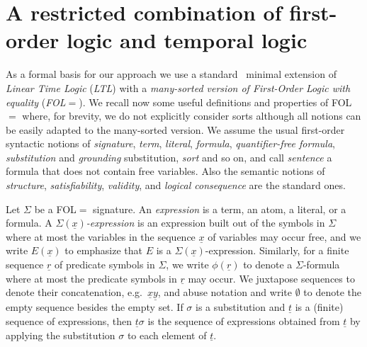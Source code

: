 \documentclass[conference]{IEEEtran}
\begin{document}
\section{A restricted combination of first-order logic and temporal logic}
\label{subsec:comb-fol-ltl}

As a formal basis for our approach we use a
standard~\cite{manna-pnueli-book} minimal extension of \emph{Linear Time Logic} (\emph{LTL})
with a \emph{many-sorted version of First-Order Logic with equality}
(\emph{FOL$=$}). We recall now some useful definitions and properties of
FOL$=$ where, for brevity, we do not explicitly consider sorts
although all notions can be easily adapted to the many-sorted version.
We assume the usual first-order syntactic notions of \emph{signature},
\emph{term}, \emph{literal}, \emph{formula}, \emph{quantifier-free
  formula}, \emph{substitution} and \emph{grounding} substitution,
\emph{sort} and so on, and call \emph{sentence} a formula that does
not contain free variables. Also the semantic notions of
\emph{structure}, \emph{satisfiability}, \emph{validity}, and
\emph{logical consequence} are the standard ones.  

Let $\Sigma$ be a FOL$=$ signature. 
An \emph{expression} is a term, an atom, a literal, or a formula.
A \emph{$\Sigma(\underline{x})$-expression} is an expression built out
of the symbols in $\Sigma$ where at most the variables in
the sequence $\underline{x}$ of variables may occur free, and we write
$E(\underline{x})$ to emphasize that $E$ is a
$\Sigma(\underline{x})$-expression. Similarly, for a finite sequence
$\underline{r}$ of predicate symbols in $\Sigma$, we write
$\phi(\underline{r})$ to denote a $\Sigma$-formula where at most the
predicate symbols in $\underline{r}$ may occur.  We juxtapose
sequences to denote their concatenation,
e.g.~$\underline{x}\underline{y}$, and abuse notation and write
$\emptyset$ to denote the empty sequence besides the empty set.  If
$\sigma$ is a substitution and $\underline{t}$ is a (finite) sequence
of expressions, then $\underline{t}\sigma$ is the sequence of
expressions obtained from $\underline{t}$ by applying the substitution
$\sigma$ to each element of $\underline{t}$.  
\end{document}
